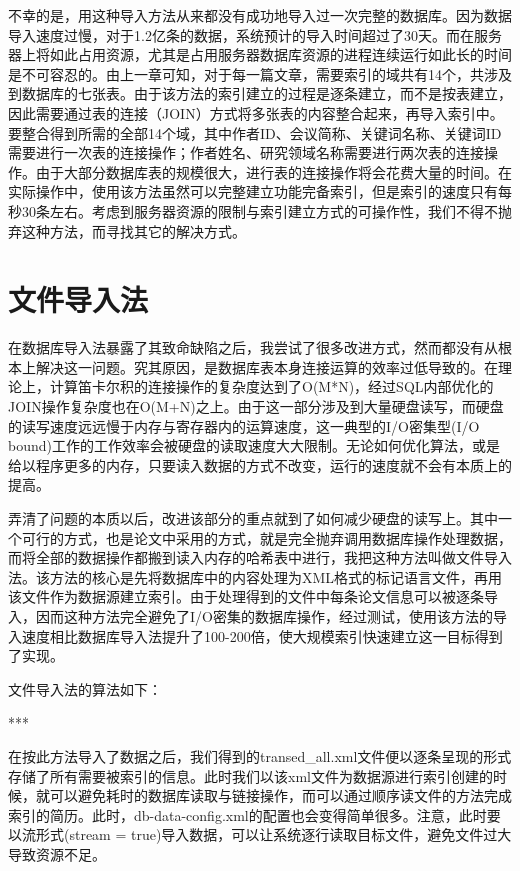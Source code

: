 不幸的是，用这种导入方法从来都没有成功地导入过一次完整的数据库。因为数据导入速度过慢，对于1.2亿条的数据，系统预计的导入时间超过了30天。而在服务器上将如此占用资源，尤其是占用服务器数据库资源的进程连续运行如此长的时间是不可容忍的。由上一章可知，对于每一篇文章，需要索引的域共有14个，共涉及到数据库的七张表。由于该方法的索引建立的过程是逐条建立，而不是按表建立，因此需要通过表的连接（JOIN）方式将多张表的内容整合起来，再导入索引中。要整合得到所需的全部14个域，其中作者ID、会议简称、关键词名称、关键词ID需要进行一次表的连接操作；作者姓名、研究领域名称需要进行两次表的连接操作。由于大部分数据库表的规模很大，进行表的连接操作将会花费大量的时间。在实际操作中，使用该方法虽然可以完整建立功能完备索引，但是索引的速度只有每秒30条左右。考虑到服务器资源的限制与索引建立方式的可操作性，我们不得不抛弃这种方法，而寻找其它的解决方式。

\section{文件导入法}
在数据库导入法暴露了其致命缺陷之后，我尝试了很多改进方式，然而都没有从根本上解决这一问题。究其原因，是数据库表本身连接运算的效率过低导致的。在理论上，计算笛卡尔积的连接操作的复杂度达到了O(M*N)，经过SQL内部优化的JOIN操作复杂度也在O(M+N)之上。由于这一部分涉及到大量硬盘读写，而硬盘的读写速度远远慢于内存与寄存器内的运算速度，这一典型的I/O密集型(I/O bound)工作的工作效率会被硬盘的读取速度大大限制。无论如何优化算法，或是给以程序更多的内存，只要读入数据的方式不改变，运行的速度就不会有本质上的提高。

弄清了问题的本质以后，改进该部分的重点就到了如何减少硬盘的读写上。其中一个可行的方式，也是论文中采用的方式，就是完全抛弃调用数据库操作处理数据，而将全部的数据操作都搬到读入内存的哈希表中进行，我把这种方法叫做文件导入法。该方法的核心是先将数据库中的内容处理为XML格式的标记语言文件，再用该文件作为数据源建立索引。由于处理得到的文件中每条论文信息可以被逐条导入，因而这种方法完全避免了I/O密集的数据库操作，经过测试，使用该方法的导入速度相比数据库导入法提升了100-200倍，使大规模索引快速建立这一目标得到了实现。

文件导入法的算法如下：

***

在按此方法导入了数据之后，我们得到的transed\_all.xml文件便以逐条呈现的形式存储了所有需要被索引的信息。此时我们以该xml文件为数据源进行索引创建的时候，就可以避免耗时的数据库读取与链接操作，而可以通过顺序读文件的方法完成索引的简历。此时，db-data-config.xml的配置也会变得简单很多。注意，此时要以流形式(stream = true)导入数据，可以让系统逐行读取目标文件，避免文件过大导致资源不足。

